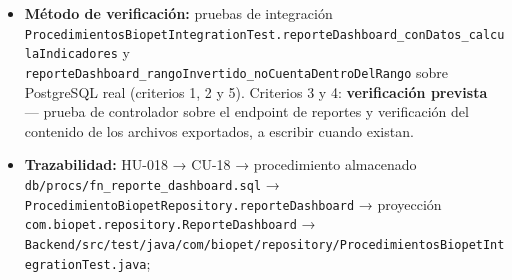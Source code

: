 \documentclass[
  spanish,
]{article}
\providecommand{\tightlist}{%
  \setlength{\itemsep}{0pt}\setlength{\parskip}{0pt}}
\begin{document}
\begin{itemize}
  \begin{enumerate}
  \def\labelenumi{\arabic{enumi}.}
  \tightlist
  \item
    Dado un rango de fechas válido, cuando se solicita el reporte,
    entonces se obtienen los indicadores del periodo: mascotas activas,
    citas programadas, consultas y vacunas dentro del rango, y mascotas
    sin consulta.
  \item
    Dado un rango invertido (fecha inicial posterior a la final),
    entonces los indicadores del periodo resultan en cero, sin error.
  \item
    Dado un reporte generado, entonces puede descargarse como PDF y como
    Excel, con los mismos valores en ambos formatos.
  \item
    Dado un usuario cuyo rol no es \texttt{ROLE\_\allowbreak{}ADMIN}, cuando solicita
    el reporte global de la clínica, entonces la respuesta es
    \texttt{403}.
  \item
    La agregación multi-tabla se implementa como procedimiento
    almacenado (ver REQ-NF-013), no como JPQL con joins.
  \end{enumerate}
\item
  \textbf{Método de verificación:} pruebas de integración
  \texttt{Procedimientos\allowbreak{}Biopet\allowbreak{}Integration\allowbreak{}Test.\allowbreak{}reporte\allowbreak{}Dashboard\_\allowbreak{}con\allowbreak{}Datos\_\allowbreak{}calcula\allowbreak{}Indicadores}
  y \texttt{reporte\allowbreak{}Dashboard\_\allowbreak{}rango\allowbreak{}Invertido\_\allowbreak{}no\allowbreak{}Cuenta\allowbreak{}Dentro\allowbreak{}Del\allowbreak{}Rango}
  sobre PostgreSQL real (criterios 1, 2 y 5). Criterios 3 y 4:
  \textbf{verificación prevista} --- prueba de controlador sobre el
  endpoint de reportes y verificación del contenido de los archivos
  exportados, a escribir cuando existan.
\item
  \textbf{Trazabilidad:} HU-018 → CU-18 → procedimiento almacenado
  \texttt{db/\allowbreak{}procs/\allowbreak{}fn\_\allowbreak{}reporte\_\allowbreak{}dashboa\allowbreak{}rd.\allowbreak{}sql} →
  \texttt{Procedimiento\allowbreak{}Biopet\allowbreak{}Repository.\allowbreak{}reporte\allowbreak{}Dashboard} → proyección
  \texttt{com.\allowbreak{}biopet.\allowbreak{}repository.\allowbreak{}Reporte\allowbreak{}Dashboard} →
  \texttt{Backend/\allowbreak{}src/\allowbreak{}test/\allowbreak{}java/\allowbreak{}com/\allowbreak{}biopet/\allowbreak{}repository/\allowbreak{}Procedimientos\allowbreak{}Biopet\allowbreak{}Integration\allowbreak{}Test.\allowbreak{}java};

\end{itemize}
\end{document}
